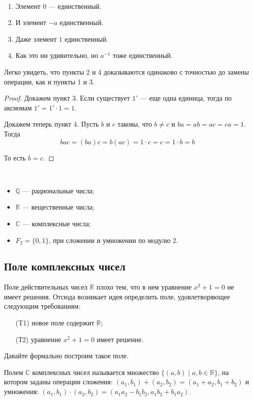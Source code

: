 \begin{Comment}
\ 
\begin{enumerate}
    \item Элемент $0$ --- единственный.
    \item И элемент $-a$ единственный.
    \item Даже элемент $1$ единственный.
    \item Как это ни удивительно, но $a^{-1}$ тоже единственный.
\end{enumerate}
\end{Comment}
Легко увидеть, что пункты 2 и 4 доказываются одинаково с точностью до замены операции, как и пункты 1 и 3.

\begin{proof}
Докажем пункт 3. Если существует $1'$ --- еще одна единица, тогда по аксиомам $1'=1'\cdot1=1$.

Докажем теперь пункт 4. Пусть $b$ и $c$ таковы, что $b \neq c$ и $ba = ab = ac = ca = 1$. Тогда 
\[
bac = \left(ba\right)c = b\left(ac\right) = 1\cdot c = c = 1 \cdot b = b
\]

То есть $b = c$.
\end{proof}

\begin{Examples} \ 
\begin{itemize}
\item $\mathbb{Q}$ — рациональные числа; 
\item $\mathbb{R}$ — вещественные числа;
\item $\mathbb{C}$ — комплексные числа;
\item $F_2 = \{0, 1\}$, при сложении и умножении по модулю 2.
\end{itemize}
\end{Examples}

\subsection*{Поле комплексных чисел}
Поле действительных чисел $\mathbb{R}$ плохо тем, что в нем уравнение $x^2 + 1 = 0$ не имеет решения. Отсюда возникает идея определить поле, удовлетворяющее следующим требованиям:
\begin{itemize}
\item[(T1)] новое поле содержит $\mathbb{R}$;
\item[(Т2)] уравнение $x^2 +1 = 0$ имеет решение.
\end{itemize}
Давайте формально построим такое поле.

\begin{Def}
Полем $\mathbb{C}$ комплексных чисел называется множество $\{(a, b) \mid a, b \in \mathbb{R}\}$, на котором заданы операции сложения: $(a_1, b_1) + (a_2, b_2) = (a_1 + a_2, b_1 + b_2)$ и умножения: $(a_1, b_1) \cdot (a_2, b_2) = (a_1a_2 - b_1b_2, a_1b_2 + b_1a_2)$.
\end{Def}

